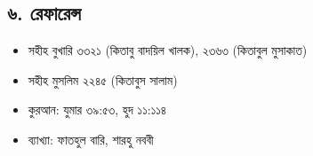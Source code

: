 \subsection*{৬. রেফারেন্স}

\begin{itemize}
\item সহীহ বুখারি ৩৩২১ (কিতাবু বাদয়িল খালক), ২৩৬৩ (কিতাবুল মুসাকাত)
\item সহীহ মুসলিম ২২৪৫ (কিতাবুস সালাম)
\item কুরআন: যুমার ৩৯:৫৩, হুদ ১১:১১৪
\item ব্যাখ্যা: ফাতহুল বারি, শারহু নববী
\end{itemize}


